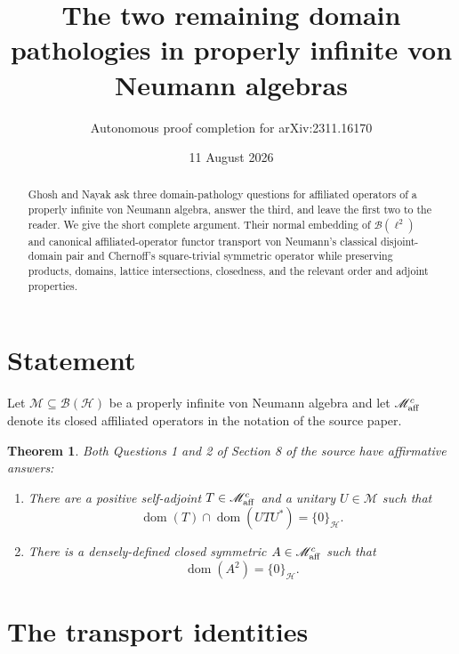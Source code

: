 \documentclass[11pt]{article}
\title{The two remaining domain pathologies in properly infinite von Neumann algebras}
\author{Autonomous proof completion for arXiv:2311.16170}
\date{11 August 2026}
\newtheorem{theorem}{Theorem}
\newcommand{\B}{\mathcal B}
\newcommand{\domn}{\operatorname{dom}}
\begin{document}
\maketitle

\begin{abstract}
Ghosh and Nayak ask three domain-pathology questions for affiliated operators
of a properly infinite von Neumann algebra, answer the third, and leave the
first two to the reader.  We give the short complete argument.  Their normal
embedding of $\B(\ell^2)$ and canonical affiliated-operator functor transport
von Neumann's classical disjoint-domain pair and Chernoff's square-trivial
symmetric operator while preserving products, domains, lattice intersections,
closedness, and the relevant order and adjoint properties.
\end{abstract}

\section{Statement}

Let $\mathscr M\subseteq\B(\mathcal H)$ be a properly infinite von Neumann
algebra and let $\mathscr M_{\rm aff}^{c}$ denote its closed affiliated
operators in the notation of the source paper.

\begin{theorem}\label{thm:main}
Both Questions 1 and 2 of Section 8 of the source have affirmative answers:
\begin{enumerate}
\item There are a positive self-adjoint $T\in\mathscr M_{\rm aff}^{c}$ and a
unitary $U\in\mathscr M$ such that
\[
 \domn(T)\cap\domn(UTU^*)=\{0\}_{\mathcal H}.
\]
\item There is a densely-defined closed symmetric
$A\in\mathscr M_{\rm aff}^{c}$ such that
\[
 \domn(A^2)=\{0\}_{\mathcal H}.
\]
\end{enumerate}
\end{theorem}

\section{The transport identities}
\end{document}
